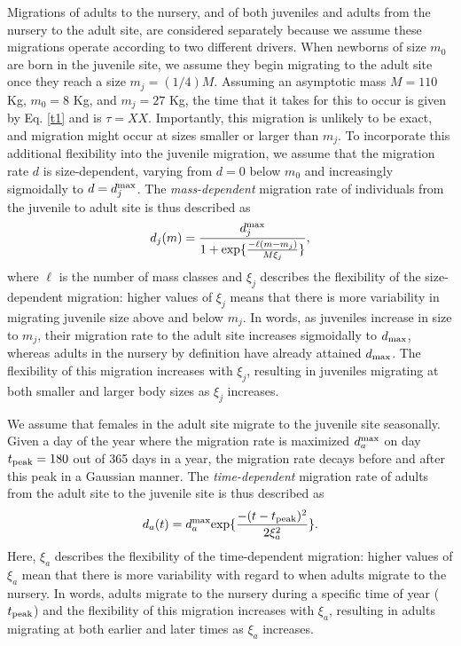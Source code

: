 \documentclass[]{rsos}%
\begin{document}
Migrations of adults to the nursery, and of both juveniles and adults from the nursery to the adult site, are considered separately because we assume these migrations operate according to two different drivers.
When newborns of size $m_0$ are born in the juvenile site, we assume they begin migrating to the adult site once they reach a size $m_j = (1/4)M$.
Assuming an asymptotic mass $M=110$ Kg, $m_0 = 8$ Kg, and $m_j = 27$ Kg, the time that it takes for this to occur is given by Eq. \ref{t1} and is $\tau = XX$.
Importantly, this migration is unlikely to be exact, and migration might occur at sizes smaller or larger than $m_j$.
To incorporate this additional flexibility into the juvenile migration, we assume that the migration rate $d$ is size-dependent, varying from $d=0$ below $m_0$ and increasingly sigmoidally to $d=d_j^{\rm max}$.
The \emph{mass-dependent} migration rate of individuals from the juvenile to adult site is thus described as
\begin{equation}
    d_j(m) = \frac{d_j^{\rm max}}{1 + {\rm exp}\{\frac{-\ell(m - m_j)}{M\xi_j}\}},
\end{equation}
where $\ell$ is the number of mass classes and $\xi_j$ describes the flexibility of the size-dependent migration: higher values of $\xi_j$ means that there is more variability in migrating juvenile size above and below $m_j$.
In words, as juveniles increase in size to $m_j$, their migration rate to the adult site increases sigmoidally to $d_{\rm max}$, whereas adults in the nursery by definition have already attained $d_{\rm max}$.
The flexibility of this migration increases with $\xi_j$, resulting in juveniles migrating at both smaller and larger body sizes as $\xi_j$ increases.



We assume that females in the adult site migrate to the juvenile site seasonally.
Given a day of the year where the migration rate is maximized $d_a^{\rm max}$ on day $t_{\rm peak} = 180$ out of 365 days in a year, the migration rate decays before and after this peak in a Gaussian manner.
The \emph{time-dependent} migration rate of adults from the adult site to the juvenile site is thus described as
\begin{equation}
    d_a(t) = d_a^{\rm max}{\rm exp}\{\frac{-(t - t_{\rm peak})^2}{2\xi_a^2}\}.
\end{equation}
Here, $\xi_a$ describes the flexibility of the time-dependent migration: higher values of $\xi_a$ mean that there is more variability with regard to when adults migrate to the nursery. 
In words, adults migrate to the nursery during a specific time of year ($t_{\rm peak}$) and the flexibility of this migration increases with $\xi_a$, resulting in adults migrating at both earlier and later times as $\xi_a$ increases.
\end{document}
